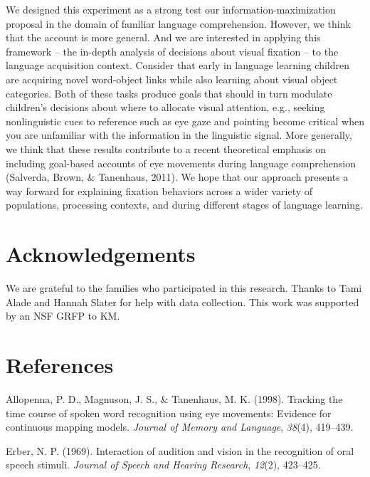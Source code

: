 \documentclass[10pt, letterpaper]{article}
\begin{document}
We designed this experiment as a strong test our
information-maximization proposal in the domain of familiar language
comprehension. However, we think that the account is more general. And
we are interested in applying this framework -- the in-depth analysis of
decisions about visual fixation -- to the language acquisition context.
Consider that early in language learning children are acquiring novel
word-object links while also learning about visual object categories.
Both of these tasks produce goals that should in turn modulate
children's decisions about where to allocate visual attention, e.g.,
seeking nonlinguistic cues to reference such as eye gaze and pointing
become critical when you are unfamiliar with the information in the
linguistic signal. More generally, we think that these results
contribute to a recent theoretical emphasis on including goal-based
accounts of eye movements during language comprehension (Salverda,
Brown, \& Tanenhaus, 2011). We hope that our approach presents a way
forward for explaining fixation behaviors across a wider variety of
populations, processing contexts, and during different stages of
language learning.

\section{Acknowledgements}\label{acknowledgements}

We are grateful to the families who participated in this research.
Thanks to Tami Alade and Hannah Slater for help with data collection.
This work was supported by an NSF GRFP to KM.

\section{References}\label{references}

\setlength{\parindent}{-0.1in} \setlength{\leftskip}{0.125in} \noindent

\hypertarget{refs}{}
\hypertarget{ref-allopenna1998tracking}{}
Allopenna, P. D., Magnuson, J. S., \& Tanenhaus, M. K. (1998). Tracking
the time course of spoken word recognition using eye movements: Evidence
for continuous mapping models. \emph{Journal of Memory and Language},
\emph{38}(4), 419--439.

\hypertarget{ref-erber1969interaction}{}
Erber, N. P. (1969). Interaction of audition and vision in the
recognition of oral speech stimuli. \emph{Journal of Speech and Hearing
Research}, \emph{12}(2), 423--425.
\end{document}
